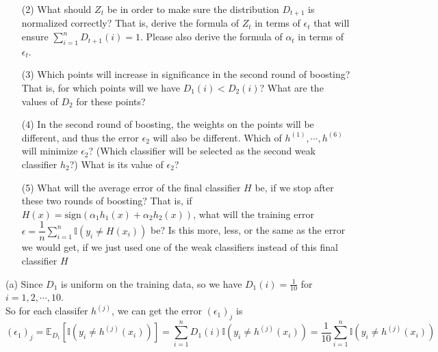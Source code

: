 \begin{itemize}
\begin{enumerate}
    \item[(2)] What should $Z_{t}$ be in order to make sure the distribution $D_{t+1}$ is normalized correctly? That is, derive the formula of $Z_{t}$ in terms of $\epsilon_{t}$ that will ensure $\sum\limits_{i=1}^{n} D_{t+1}(i) = 1$. Please also derive the formula of $\alpha_{t}$ in terms of $\epsilon_{t}$. ~

    \item[(3)] Which points will increase in significance in the second round of boosting? That is, for which points will we have $D_{1}(i) < D_{2}(i)$? What are the values of $D_{2}$ for these points? ~

    \item[(4)] In the second round of boosting, the weights on the points will be different, and thus the error $\epsilon_2$ will also be different. Which of $h^{(1)}, \cdots, h^{(6)}$ will minimize $\epsilon_2$? (Which classifier will be selected as the second weak classifier $h_2$?) What is its value of $\epsilon_2$? ~

    \item[(5)] What will the average error of the final classifier $H$ be, if we stop after these two rounds of boosting? That is, if $H(x) = \text{sign}(\alpha_{1}h_{1}(x) + \alpha_{2}h_{2}(x))$, what will the  training error $\epsilon = \dfrac{1}{n} \sum\limits_{i=1}^{n} \mathbb{I} (y_{i} \neq H(x_{i}))$ be? Is this more, less, or the same as the error we would get, if we just used one of the weak classifiers instead of this final classifier $H$ ~

\end{enumerate}
\end{itemize}

\solution

(a) Since $D_1$ is uniform on the training data, so we have $D_1(i)=\frac{1}{10}$ for $i=1,2,\cdots,10$. \\
So for each classifer $h^{(j)}$, we can get the error $(\epsilon_1)_j$ is
$$(\epsilon_1)_j=\mathbb{E}_{D_1}[\mathbb{I}(y_{i} \neq h^{(j)}(x_{i}))]=\sum_{i=1}^{n} D_1(i)\mathbb{I}(y_{i} \neq h^{(j)}(x_{i}))=\dfrac{1}{10}\sum_{i=1}^n\mathbb{I}(y_{i} \neq h^{(j)}(x_{i}))$$

